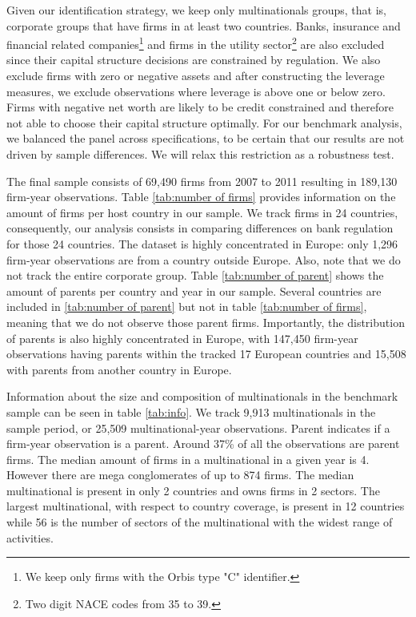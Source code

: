 \documentclass[12pt]{article}
\begin{document}
	Given our identification strategy, we keep only multinationals groups, that is, corporate groups that have firms in at least two countries.  Banks, insurance and financial related companies\footnote{We keep only firms with the Orbis type "C" identifier.} and firms in the utility sector\footnote{Two digit NACE codes from 35 to 39.} are also excluded since their capital structure decisions are constrained by regulation. We also exclude firms with zero or negative assets and after constructing the leverage measures, we exclude observations where leverage is above one or below zero. Firms with negative net worth are likely to be credit constrained and therefore not able to choose their capital structure optimally. For our benchmark analysis, we balanced the panel across specifications, to be certain that our results are not driven by sample differences. We will relax this restriction as a robustness test.
	


	The final sample consists of 69,490 firms from 2007 to 2011 resulting in 189,130 firm-year observations. Table \ref{tab:number of firms} provides information on the amount of firms per host country in our sample. We track firms in 24 countries, consequently, our analysis consists in comparing differences on bank regulation for those 24 countries. The dataset is highly concentrated in Europe: only 1,296 firm-year observations are from a country outside Europe. Also, note that we do not track the entire corporate group. Table \ref{tab:number of parent} shows the amount of parents per country and year in our sample. Several countries are included in \ref{tab:number of parent} but not in table \ref{tab:number of firms}, meaning that we do not observe those parent firms. Importantly, the distribution of parents is also highly concentrated in Europe, with 147,450 firm-year observations having parents within the tracked 17 European countries and 15,508 with parents from another country in Europe.
	
	Information about the size and composition of multinationals in the benchmark sample can be seen in table \ref{tab:info}. We track 9,913 multinationals in the sample period, or 25,509 multinational-year observations. Parent indicates if a firm-year observation is a parent. Around 37\% of all the observations are parent firms. The median amount of firms in a multinational in a given year is 4. However there are mega conglomerates of up to 874 firms. The median multinational is present in only 2 countries and owns firms in 2 sectors. The largest multinational, with respect to country coverage, is present in 12 countries while 56 is the number of sectors of the multinational with the widest range of activities.
	   
\end{document}
